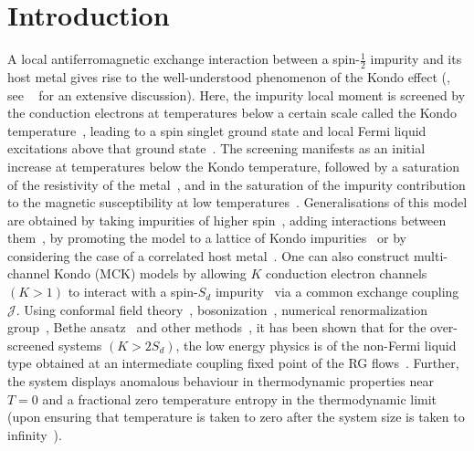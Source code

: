 \documentclass{iopart}
\begin{document}
\ioptwocol

\section{Introduction}

A local antiferromagnetic exchange interaction between a spin-\(\frac{1}{2}\) impurity and its host metal gives rise to the well-understood phenomenon of the Kondo effect (\cite{kondo1964resistance}, see ~\cite{hewson1993} for an extensive discussion). Here, the impurity local moment is screened by the conduction electrons at temperatures below a certain scale called the Kondo temperature~\cite{anderson1969exact,anderson1970exact,anderson1970,wilson1975,andreiKondoreview,
tsvelickKondoreview,affleck1993exact,affleck1995conformal}, leading to a spin singlet ground state and local Fermi liquid excitations above that ground state~\cite{nozieres1974fermi,hewsonp}. The screening manifests as an initial increase at temperatures below the Kondo temperature, followed by a saturation of the resistivity of the metal~\cite{kondo1964resistance,Zhang2013}, and in the saturation of the impurity contribution to the magnetic susceptibility at low temperatures~\cite{wilson1975,andreiKondoreview,tsvelickKondoreview}.
Generalisations of this model are obtained by taking impurities of higher spin~\cite{hewson1993,Noz_blandin_1980,affleck1993exact}, adding interactions between them~\cite{affleck_1992,affleck_ludwig_jones_1992,georges_1999,zarand_chung_2006,
mitchell_logan_2011,mitchell_sela_2012,konig_coleman_2021}, by promoting the model to a lattice of Kondo impurities~\cite{coleman_1987,millis_lee_1987,auerbach_1986,rice_ueda_1986,stewart_1984} or by considering the case of a correlated host metal~\cite{granath_1998}. One can also construct multi-channel Kondo (MCK) models by allowing \(K\) conduction electron channels \( \left(K > 1\right) \) to interact with a spin-\(S_{d}\) impurity~\cite{Noz_blandin_1980,zawadowski_1980,cox_zawadowski_1998} via a common exchange coupling \(\mathcal{J}\). Using conformal field theory~\cite{affleck_1991_overscreen,affleck_ludwig_1991,affleck_pang_cox_1992,affleck1993exact,parcollet_olivier_large_N,affleck_2005}, bosonization~\cite{emery_kivelson,clarke_giamarchi_1993,zarand_2000,vondelft_prl_1998,schofield_1997}, numerical renormalization group~\cite{bullaNRGreview,affleck_pang_cox_1992,pang_cox_1991}, Bethe ansatz~\cite{andrei_destri_1984,Tsvelick1984,Tsvelick_1985,andrei_jerez_1995,zarand_costi_2002} and other methods~\cite{sengupta_1994,fabrizio_nozieres_1995,Coleman_tsvelik,fabrizio_gogolin_1995}, it has been shown that for the over-screened systems \(\left(K > 2S_d\right)\), the low energy physics is of the non-Fermi liquid type obtained at an intermediate coupling fixed point of the RG flows~\cite{Noz_blandin_1980}. Further, the system displays anomalous behaviour in thermodynamic properties near \(T=0\) and a fractional zero temperature entropy in the thermodynamic limit (upon ensuring that temperature is taken to zero after the system size is taken to infinity~\cite{rozhkov_1998,vondelft_prl_1998}).
\end{document}
